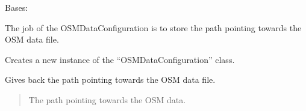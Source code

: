 \documentclass[letterpaper,10pt,english]{sphinxmanual}
\begin{document}
\begin{fulllineitems}
\label{\detokenize{apidoc/src.osm_configurator.model.project.configuration:src.osm_configurator.model.project.configuration.osm_data_configuration.OSMDataConfiguration}}
\pysigstartsignatures
{}
\pysigstopsignatures
\sphinxAtStartPar
Bases: 

\sphinxAtStartPar
The job of the OSMDataConfiguration is to store the path pointing towards the OSM data file.

\begin{fulllineitems}
\label{\detokenize{apidoc/src.osm_configurator.model.project.configuration:src.osm_configurator.model.project.configuration.osm_data_configuration.OSMDataConfiguration.__init__}}
\pysigstartsignatures
{}
\pysigstopsignatures
\sphinxAtStartPar
Creates a new instance of the “OSMDataConfiguration” class.

\end{fulllineitems}


\begin{fulllineitems}
\label{\detokenize{apidoc/src.osm_configurator.model.project.configuration:src.osm_configurator.model.project.configuration.osm_data_configuration.OSMDataConfiguration.get_osm_data}}
\pysigstartsignatures
{}
\pysigstopsignatures
\sphinxAtStartPar
Gives back the path pointing towards the OSM data file.
\begin{quote}\begin{description}
\sphinxAtStartPar
The path pointing towards the OSM data.

\sphinxAtStartPar
{}

\end{description}\end{quote}


\end{fulllineitems}
\end{fulllineitems}
\end{document}
